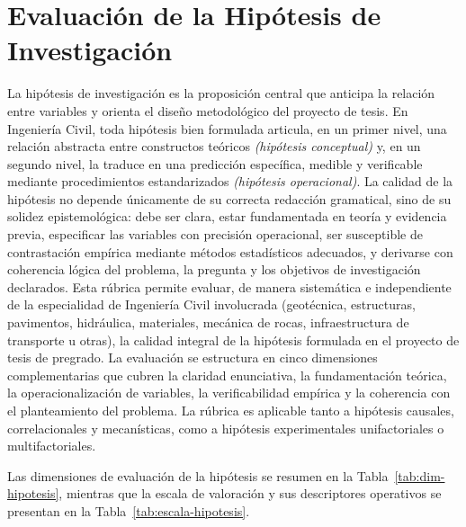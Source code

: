 \clearpage
\section{Evaluación de la Hipótesis de Investigación}

{\footnotesize
La hipótesis de investigación es la proposición central que anticipa la relación entre variables y orienta el diseño metodológico del proyecto de tesis. En Ingeniería Civil, toda hipótesis bien formulada articula, en un primer nivel, una relación abstracta entre constructos teóricos \textit{(hipótesis conceptual)} y, en un segundo nivel, la traduce en una predicción específica, medible y verificable mediante procedimientos estandarizados \textit{(hipótesis operacional)}. La calidad de la hipótesis no depende únicamente de su correcta redacción gramatical, sino de su solidez epistemológica: debe ser clara, estar fundamentada en teoría y evidencia previa, especificar las variables con precisión operacional, ser susceptible de contrastación empírica mediante métodos estadísticos adecuados, y derivarse con coherencia lógica del problema, la pregunta y los objetivos de investigación declarados. Esta rúbrica permite evaluar, de manera sistemática e independiente de la especialidad de Ingeniería Civil involucrada (geotécnica, estructuras, pavimentos, hidráulica, materiales, mecánica de rocas, infraestructura de transporte u otras), la calidad integral de la hipótesis formulada en el proyecto de tesis de pregrado. La evaluación se estructura en cinco dimensiones complementarias que cubren la claridad enunciativa, la fundamentación teórica, la operacionalización de variables, la verificabilidad empírica y la coherencia con el planteamiento del problema. La rúbrica es aplicable tanto a hipótesis causales, correlacionales y mecanísticas, como a hipótesis experimentales unifactoriales o multifactoriales.\par
}
Las dimensiones de evaluación de la hipótesis se resumen en la Tabla~\ref{tab:dim-hipotesis}, mientras que la escala de valoración y sus descriptores operativos se presentan en la Tabla~\ref{tab:escala-hipotesis}.

